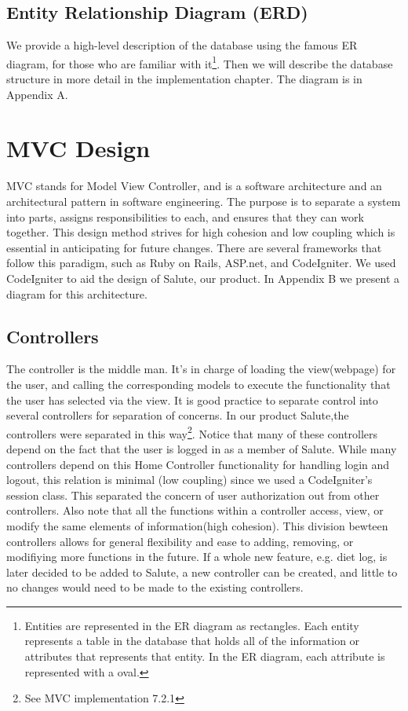 \documentclass[12pt]{report}
\begin{document}
\subsection{Entity Relationship Diagram (ERD)}
We provide a high-level description of the database using the famous ER diagram, for those who are familiar with it\footnote{Entities are represented in the ER diagram as rectangles.  Each entity represents a table in the database that holds all of the information or attributes that represents that entity.  In the ER diagram, each attribute is represented with a oval.}. Then we will describe the database structure in more detail in the implementation chapter. The diagram is in Appendix A.


\section{MVC Design}

MVC stands for Model View Controller, and is a software architecture and an architectural pattern in software engineering. The purpose is to separate a system into parts, assigns responsibilities to each, and ensures that they can work together. This design method strives for high cohesion and low coupling which is essential in anticipating for future changes. There are several frameworks that follow this paradigm, such as Ruby on Rails, ASP.net, and CodeIgniter. We used CodeIgniter to aid the design of Salute, our product.  In Appendix B we present a diagram for this architecture.


\subsection{Controllers}

The controller is the middle man. It's in charge of loading the view(webpage) for the user, and calling the corresponding models to execute the functionality that the user has selected via the view. 
It is good practice to separate control into several controllers for separation of concerns. In our product Salute,the controllers were separated in this way\footnote{See MVC implementation 7.2.1}. Notice that many of these controllers depend on the fact that the user is logged in as a member of Salute. While many controllers depend on this Home Controller functionality for handling login and logout, this relation is minimal (low coupling) since we used a CodeIgniter's session class. This separated the concern of user authorization out from other controllers. 
Also note that all the functions within a controller access, view, or modify the same elements of information(high cohesion). This division bewteen controllers allows for general flexibility and ease to adding, removing, or modifiying more functions in the future. If a whole new feature, e.g. diet log, is later decided to be added to Salute, a new controller can be created, and little to no changes would need to be made to the existing controllers. 
\end{document}
